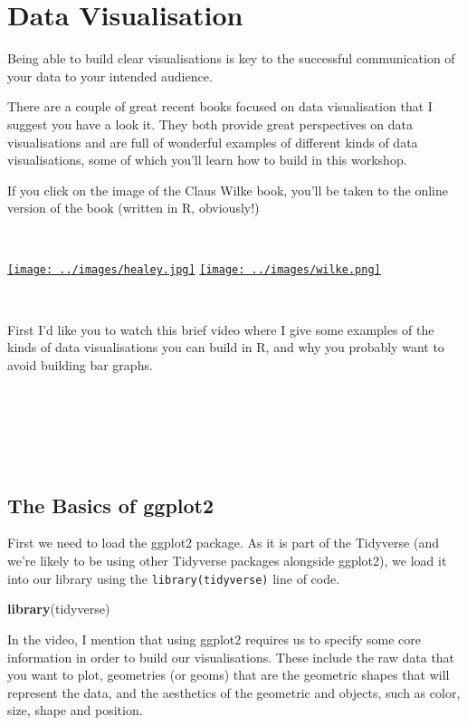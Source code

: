 \documentclass[
]{book}
\newenvironment{Shaded}{\begin{snugshade}}{\end{snugshade}}
\newcommand{\FunctionTok}[1]{\textcolor[rgb]{0.13,0.29,0.53}{\textbf{#1}}}
\newcommand{\NormalTok}[1]{#1}
\begin{document}
\hypertarget{data-visualisation}{%
\chapter{Data Visualisation}\label{data-visualisation}}

Being able to build clear visualisations is key to the successful communication of your data to your intended audience.

There are a couple of great recent books focused on data visualisation that I suggest you have a look it. They both provide great perspectives on data visualisations and are full of wonderful examples of different kinds of data visualisations, some of which you'll learn how to build in this workshop.

If you click on the image of the Claus Wilke book, you'll be taken to the online version of the book (written in R, obviously!)

~~

\href{https://socviz.co}{\texttt{[image: ../images/healey.jpg]}} \href{https://serialmentor.com/dataviz/}{\texttt{[image: ../images/wilke.png]}}

~~

First I'd like you to watch this brief video where I give some examples of the kinds of data visualisations you can build in R, and why you probably want to avoid building bar graphs.

~~

~~

~~

\hypertarget{the-basics-of-ggplot2}{%
\section{The Basics of ggplot2}\label{the-basics-of-ggplot2}}

First we need to load the ggplot2 package. As it is part of the Tidyverse (and we're likely to be using other Tidyverse packages alongside ggplot2), we load it into our library using the \texttt{library(tidyverse)} line of code.

\begin{Shaded}
\begin{Highlighting}[]
\FunctionTok{library}\NormalTok{(tidyverse)}
\end{Highlighting}
\end{Shaded}

In the video, I mention that using ggplot2 requires us to specify some core information in order to build our visualisations. These include the raw data that you want to plot, geometries (or geoms) that are the geometric shapes that will represent the data, and the aesthetics of the geometric and objects, such as color, size, shape and position.
\end{document}
